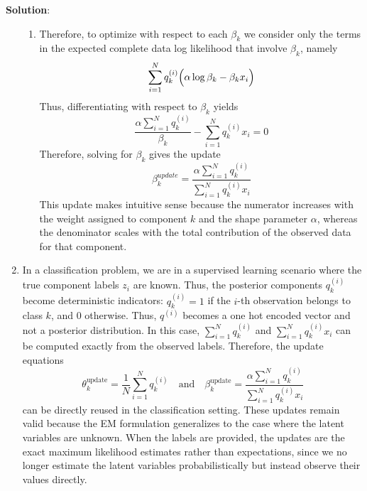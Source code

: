 \documentclass[submit]{../harvardml}
\newenvironment{solution}{
    \vspace{2mm}
    \color{blue}\noindent\textbf{Solution}:
}{}
\begin{document}
\begin{solution}
\begin{enumerate}
\begin{enumerate}
        \item
        Therefore, to optimize with respect to each $\beta_k$ we consider only the terms in the expected complete data log likelihood that involve $\beta_k$, namely 
        $$ \sum_{i=1}^Nq^{(i)}_k\Bigl(\alpha\log\beta_k-\beta_kx_i\Bigr) $$
        Thus, differentiating with respect to $\beta_k$ yields 
        $$ \frac{\alpha\sum_{i=1}^Nq^{(i)}_k}{\beta_k}-\sum_{i=1}^Nq^{(i)}_kx_i=0 $$
        Therefore, solving for $\beta_k$ gives the update 
        $$ \beta_k^{update}=\frac{\alpha\sum_{i=1}^Nq^{(i)}_k}{\sum_{i=1}^Nq^{(i)}_kx_i} $$
        This update makes intuitive sense because the numerator increases with the weight assigned to component $k$ and the shape parameter $\alpha$, whereas the denominator scales with the total contribution of the observed data for that component.
    \end{enumerate}
    
    \item
    In a classification problem, we are in a supervised learning scenario where the true component labels $z_i$ are known. Thus, the posterior components $q_k^{(i)}$ become deterministic indicators: $q_k^{(i)} = 1$ if the $i$-th observation belongs to class $k$, and $0$ otherwise. Thus, $q^{(i)}$ becomes a one hot encoded vector and not a posterior distribution. In this case, $\sum_{i=1}^N q_k^{(i)}$ and $\sum_{i=1}^N q_k^{(i)} x_i$ can be computed exactly from the observed labels. Therefore, the update equations
    $$
    \theta_k^{\text{update}} = \frac{1}{N} \sum_{i=1}^N q_k^{(i)} \quad \text{and} \quad 
    \beta_k^{\text{update}} = \frac{\alpha \sum_{i=1}^N q_k^{(i)}}{\sum_{i=1}^N q_k^{(i)} x_i}
    $$
    can be directly reused in the classification setting. These updates remain valid because the EM formulation generalizes to the case where the latent variables are unknown. When the labels are provided, the updates are the exact maximum likelihood estimates rather than expectations,  since we no longer estimate the latent variables probabilistically but instead observe their values directly.
\end{enumerate}
\end{solution}

\newpage
\end{document}
